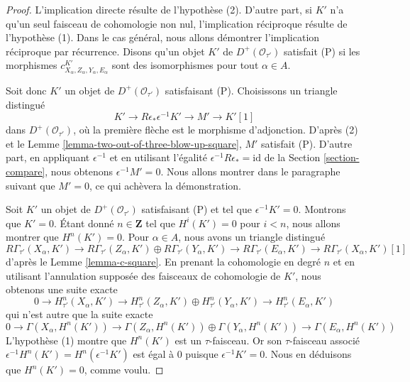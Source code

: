 \begin{proof}
L'implication directe résulte de l'hypothèse (2). D'autre part, si $K'$
n'a qu'un seul faisceau de cohomologie non nul, l'implication réciproque
résulte de l'hypothèse (1). Dans le cas général, nous allons démontrer
l'implication réciproque par récurrence. Disons qu'un objet $K'$ de
$D^+(\mathcal{O}_{\tau'})$ satisfait (P) si les morphismes
$c^{K'}_{X_\alpha, Z_\alpha, Y_\alpha, E_\alpha}$ sont des isomorphismes
pour tout $\alpha \in A$.

\medskip\noindent
Soit donc $K'$ un objet de $D^+(\mathcal{O}_{\tau'})$ satisfaisant (P).
Choisissons un triangle distingué
$$
K' \to R\epsilon_*\epsilon^{-1}K' \to M' \to K'[1]
$$
dans $D^+(\mathcal{O}_{\tau'})$, où la première flèche est le morphisme
d'adjonction. D'après (2) et le Lemme
\ref{lemma-two-out-of-three-blow-up-square}, $M'$ satisfait (P). D'autre
part, en appliquant $\epsilon^{-1}$ et en utilisant l'égalité
$\epsilon^{-1}R\epsilon_* = \text{id}$ de la Section
\ref{section-compare}, nous obtenons $\epsilon^{-1}M' = 0$. Nous allons
montrer dans le paragraphe suivant que $M' = 0$, ce qui achèvera la
démonstration.

\medskip\noindent
Soit $K'$ un objet de $D^+(\mathcal{O}_{\tau'})$ satisfaisant (P) et tel
que $\epsilon^{-1}K' = 0$. Montrons que $K' = 0$. Étant donné
$n \in \mathbf{Z}$ tel que $H^i(K') = 0$ pour $i < n$, nous allons montrer
que $H^n(K') = 0$. Pour $\alpha \in A$, nous avons un triangle distingué
$$
R\Gamma_{\tau'}(X_\alpha, K') \to
R\Gamma_{\tau'}(Z_\alpha, K') \oplus
R\Gamma_{\tau'}(Y_\alpha, K') \to
R\Gamma_{\tau'}(E_\alpha, K') \to
R\Gamma_{\tau'}(X_\alpha, K')[1]
$$
d'après le Lemme \ref{lemma-c-square}. En prenant la cohomologie en degré
$n$ et en utilisant l'annulation supposée des faisceaux de cohomologie de
$K'$, nous obtenons une suite exacte
$$
0 \to
H^n_{\tau'}(X_\alpha, K') \to
H^n_{\tau'}(Z_\alpha, K') \oplus
H^n_{\tau'}(Y_\alpha, K') \to
H^n_{\tau'}(E_\alpha, K')
$$
qui n'est autre que la suite exacte
$$
0 \to
\Gamma(X_\alpha, H^n(K')) \to
\Gamma(Z_\alpha, H^n(K')) \oplus
\Gamma(Y_\alpha, H^n(K')) \to
\Gamma(E_\alpha, H^n(K'))
$$
L'hypothèse (1) montre que $H^n(K')$ est un $\tau$-faisceau. Or son
$\tau$-faisceau associé
$\epsilon^{-1}H^n(K') = H^n(\epsilon^{-1}K')$ est égal à $0$ puisque
$\epsilon^{-1}K' = 0$. Nous en déduisons que $H^n(K') = 0$, comme voulu.
\end{proof}

